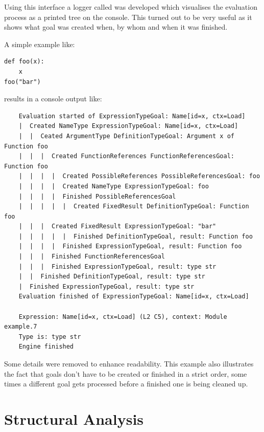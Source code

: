 \documentclass[12pt,halfparskip,DIV11,BCOR10mm]{scrreprt}
\begin{document}
Using this interface a logger called  was developed which visualises the evaluation process as a printed tree on the console. This turned out to be very useful as it shows what goal was created when, by whom and when it was finished. 

A simple example like:
\begin{lstlisting}
def foo(x):
    x
foo("bar")
\end{lstlisting}

results in a console output like:
\begin{verbatim}
    Evaluation started of ExpressionTypeGoal: Name[id=x, ctx=Load]
    |  Created NameType ExpressionTypeGoal: Name[id=x, ctx=Load]
    |  |  Ceated ArgumentType DefinitionTypeGoal: Argument x of Function foo
    |  |  |  Created FunctionReferences FunctionReferencesGoal: Function foo
    |  |  |  |  Created PossibleReferences PossibleReferencesGoal: foo
    |  |  |  |  Created NameType ExpressionTypeGoal: foo
    |  |  |  |  Finished PossibleReferencesGoal
    |  |  |  |  |  Created FixedResult DefinitionTypeGoal: Function foo
    |  |  |  Created FixedResult ExpressionTypeGoal: "bar"
    |  |  |  |  |  Finished DefinitionTypeGoal, result: Function foo
    |  |  |  |  Finished ExpressionTypeGoal, result: Function foo
    |  |  |  Finished FunctionReferencesGoal
    |  |  |  Finished ExpressionTypeGoal, result: type str
    |  |  Finished DefinitionTypeGoal, result: type str
    |  Finished ExpressionTypeGoal, result: type str
    Evaluation finished of ExpressionTypeGoal: Name[id=x, ctx=Load]

    Expression: Name[id=x, ctx=Load] (L2 C5), context: Module example.7
    Type is: type str
    Engine finished
\end{verbatim}

Some details were removed to enhance readability. This example also illustrates the fact that goals don't have to be created or finished in a strict order, some times a different goal gets processed before a finished one is being cleaned up.




\chapter{Structural Analysis}
\end{document}
